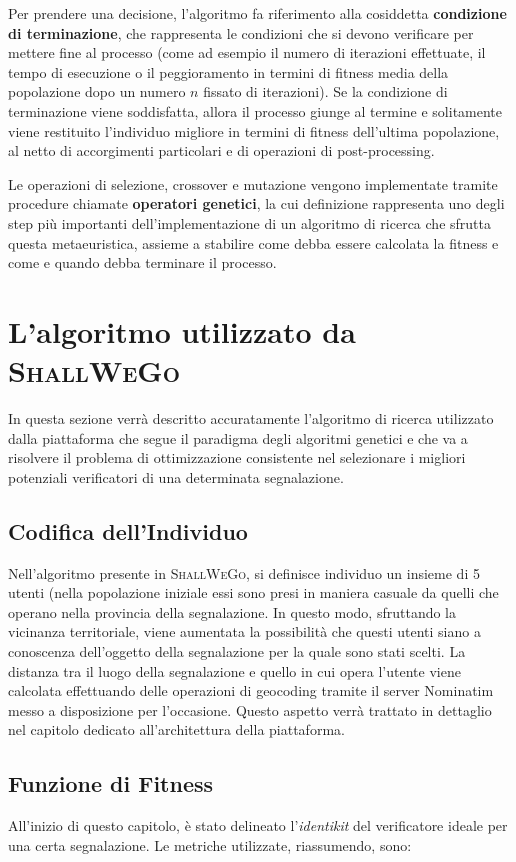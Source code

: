     Per prendere una decisione, l'algoritmo fa riferimento alla cosiddetta \textbf{condizione di terminazione}, che rappresenta le condizioni che si devono verificare per mettere fine al processo (come ad esempio il numero di iterazioni effettuate, il tempo di esecuzione o il peggioramento in termini di fitness media della popolazione dopo un numero $n$ fissato di iterazioni). Se la condizione di terminazione viene soddisfatta, allora il processo giunge al termine e solitamente viene restituito l'individuo migliore in termini di fitness dell'ultima popolazione, al netto di accorgimenti particolari e di operazioni di post-processing.

    Le operazioni di selezione, crossover e mutazione vengono implementate tramite procedure chiamate \textbf{operatori genetici}, la cui definizione rappresenta uno degli step più importanti dell'implementazione di un algoritmo di ricerca che sfrutta questa metaeuristica, assieme a stabilire come debba essere calcolata la fitness e come e quando debba terminare il processo. 

\section{L'algoritmo utilizzato da \textsc{ShallWeGo}}
    In questa sezione verrà descritto accuratamente l'algoritmo di ricerca utilizzato dalla piattaforma che segue il paradigma degli algoritmi genetici e che va a risolvere il problema di ottimizzazione consistente nel selezionare i migliori potenziali verificatori di una determinata segnalazione.

\subsection{Codifica dell'Individuo}
    Nell'algoritmo presente in \textsc{ShallWeGo}, si definisce individuo un insieme di 5 utenti (nella popolazione iniziale essi sono presi in maniera casuale da quelli che operano nella provincia della segnalazione. In questo modo, sfruttando la vicinanza territoriale, viene aumentata la possibilità che questi utenti siano a conoscenza dell'oggetto della segnalazione per la quale sono stati scelti. La distanza tra il luogo della segnalazione e quello in cui opera l'utente viene calcolata effettuando delle operazioni di geocoding tramite il server Nominatim messo a disposizione per l'occasione. Questo aspetto verrà trattato in dettaglio nel capitolo dedicato all'architettura della piattaforma.

\subsection{Funzione di Fitness}
    All'inizio di questo capitolo, è stato delineato l'\textit{identikit} del verificatore ideale per una certa segnalazione. Le metriche utilizzate, riassumendo, sono:

